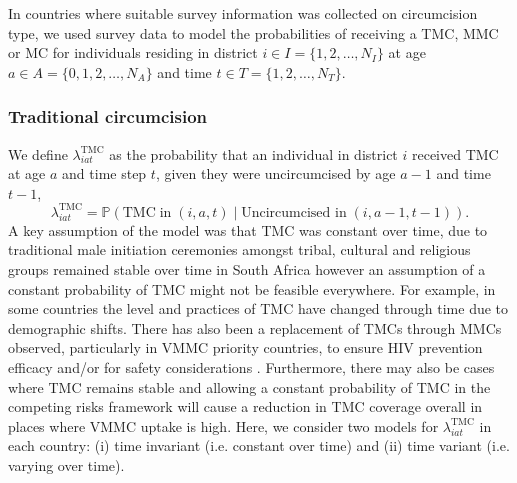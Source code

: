 \documentclass{article}
\begin{document}
\begin{appendix}
In countries where suitable survey information was collected on circumcision type, we used survey data to model the probabilities of receiving a TMC, MMC or MC for individuals residing in district $i \in I = \{1, 2, \ldots, N_I\}$ at age $a \in A = \{0, 1, 2, \ldots, N_A\}$ and time $t \in T = \{1, 2, \ldots, N_T\}$. 


\subsubsection*{Traditional circumcision}


\noindent We define $\lambda^{\text{TMC}}_{iat}$ as the probability that an individual in district $i$ received TMC at age $a$ and time step $t$, given they were uncircumcised by age $a-1$ and time $t-1$, 
\begin{equation} 
		\lambda^{\text{TMC}}_{iat} = \mathbb{P}(\text{TMC} \; \text{in} \; (i,a,t) \; | \; \text{Uncircumcised in} \; (i,a-1, t-1)). 
	\label{eqn::TMC}
\end{equation}
A key assumption of the \cite{thomas2021multilevel} model was that TMC was constant over time, due to traditional male initiation ceremonies amongst tribal, cultural and religious groups remained stable over time in South Africa however an assumption of a constant probability of TMC might not be feasible everywhere. For example, in some countries the level and practices of TMC have changed through time due to demographic shifts. There has also been a replacement of TMCs through MMCs observed, particularly in VMMC priority countries, to ensure HIV prevention efficacy and/or for safety considerations \cite{thomas2021multilevel}. Furthermore, there may also be cases where TMC remains stable and allowing a constant probability of TMC in the competing risks framework will cause a reduction in TMC coverage overall in places where VMMC uptake is high. Here, we consider two models for $\lambda^{\text{TMC}}_{iat}$ in each country: (i) time invariant (i.e. constant over time) and (ii) time variant (i.e. varying over time). 


\end{appendix}
\end{document}
